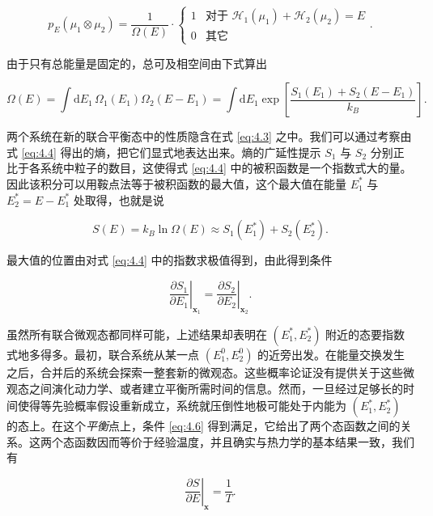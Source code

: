 \begin{equation}\label{eq:4.3}
  p_E(\mu_1\otimes\mu_2)=\frac{1}{\Omega(E)}\cdot
  \begin{cases}1 & \text{对于 }\mathscr H_1(\mu_1)+\mathscr H_2(\mu_2)=E\\ 0 & \text{其它}\end{cases}.
\end{equation}

由于只有总能量是固定的，总可及相空间由下式算出

\begin{equation}\label{eq:4.4}
  \Omega(E)=\int \mathrm{d}E_1\,\Omega_1(E_1)\Omega_2(E-E_1)=\int \mathrm{d}E_1\exp\left[\frac{S_1(E_1)+S_2(E-E_1)}{k_B}\right].
\end{equation}


两个系统在新的联合平衡态中的性质隐含在式 \eqref{eq:4.3} 之中。我们可以通过考察由式 \eqref{eq:4.4} 得出的熵，把它们显式地表达出来。熵的广延性提示 $S_1$ 与 $S_2$ 分别正比于各系统中粒子的数目，这使得式 \eqref{eq:4.4} 中的被积函数是一个指数式大的量。因此该积分可以用鞍点法等于被积函数的最大值，这个最大值在能量 $E_1^*$ 与 $E_2^*=E-E_1^*$ 处取得，也就是说

\begin{equation}\label{eq:4.5}
  S(E)=k_B\ln\Omega(E)\approx S_1(E_1^*)+S_2(E_2^*).
\end{equation}

最大值的位置由对式 \eqref{eq:4.4} 中的指数求极值得到，由此得到条件

\begin{equation}\label{eq:4.6}
  \left.\frac{\partial S_1}{\partial E_1}\right|_{\mathbf x_1}=\left.\frac{\partial S_2}{\partial E_2}\right|_{\mathbf x_2}.
\end{equation}

虽然所有联合微观态都同样可能，上述结果却表明在 $(E_1^*,E_2^*)$ 附近的态要指数式地多得多。最初，联合系统从某一点 $(E_1^0,E_2^0)$ 的近旁出发。在能量交换发生之后，合并后的系统会探索一整套新的微观态。这些概率论证没有提供关于这些微观态之间演化动力学、或者建立平衡所需时间的信息。然而，一旦经过足够长的时间使得等先验概率假设重新成立，系统就压倒性地极可能处于内能为 $(E_1^*,E_2^*)$ 的态上。在这个\emph{平衡}点上，条件 \eqref{eq:4.6} 得到满足，它给出了两个态函数之间的关系。这两个态函数因而等价于经验温度，并且确实与热力学的基本结果一致，我们有

\begin{equation}\label{eq:4.7}
  \left.\frac{\partial S}{\partial E}\right|_{\mathbf x}=\frac{1}{T}.
\end{equation}

